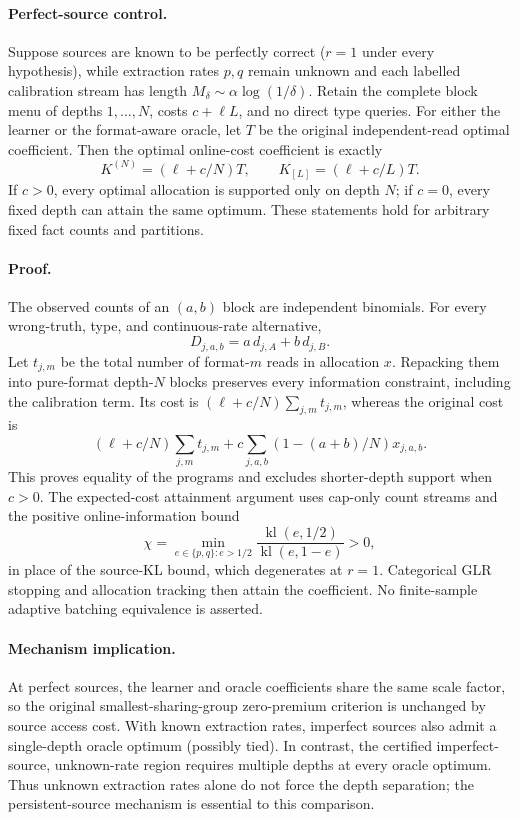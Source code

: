 \paragraph{Perfect-source control.}
Suppose sources are known to be perfectly correct ($r=1$ under every
hypothesis), while extraction rates $p,q$ remain unknown and each labelled
calibration stream has length $M_\delta\sim\alpha\log(1/\delta)$.
Retain the complete block menu of depths $1,\ldots,N$, costs $c+\ell L$,
and no direct type queries. For either the learner or the format-aware
oracle, let $T$ be the original independent-read optimal coefficient.
Then the optimal online-cost coefficient is exactly
\[
K^{(N)}=(\ell+c/N)T,\qquad K_{[L]}=(\ell+c/L)T.
\]
If $c>0$, every optimal allocation is supported only on depth $N$;
if $c=0$, every fixed depth can attain the same optimum.
These statements hold for arbitrary fixed fact counts and partitions.

\paragraph{Proof.}
The observed counts of an $(a,b)$ block are independent binomials.
For every wrong-truth, type, and continuous-rate alternative,
\[
D_{j,a,b}=a\,d_{j,A}+b\,d_{j,B}.
\]
Let $t_{j,m}$ be the total number of format-$m$ reads in allocation $x$.
Repacking them into pure-format depth-$N$ blocks preserves every
information constraint, including the calibration term. Its cost is
$(\ell+c/N)\sum_{j,m}t_{j,m}$, whereas the original cost is
\[
(\ell+c/N)\sum_{j,m}t_{j,m}
+c\sum_{j,a,b}(1-(a+b)/N)x_{j,a,b}.
\]
This proves equality of the programs and excludes shorter-depth support
when $c>0$. The expected-cost attainment argument uses cap-only count
streams and the positive online-information bound
\[
\chi=\min_{e\in\{p,q\}:e>1/2}
\frac{\operatorname{kl}(e,1/2)}{\operatorname{kl}(e,1-e)}>0,
\]
in place of the source-KL bound, which degenerates at $r=1$.
Categorical GLR stopping and allocation tracking then attain the
coefficient. No finite-sample adaptive batching equivalence is asserted.

\paragraph{Mechanism implication.}
At perfect sources, the learner and oracle coefficients share the same
scale factor, so the original smallest-sharing-group zero-premium
criterion is unchanged by source access cost.
With known extraction rates, imperfect sources also admit a
single-depth oracle optimum (possibly tied).
In contrast, the certified imperfect-source, unknown-rate region requires
multiple depths at every oracle optimum.
Thus unknown extraction rates alone do not force the depth separation;
the persistent-source mechanism is essential to this comparison.
